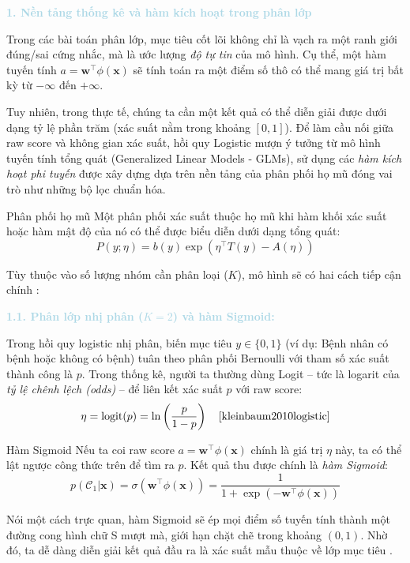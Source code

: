 \vspace{0.5em}
\noindent\textcolor{lightblue}{\textbf{1. Nền tảng thống kê và hàm kích hoạt trong phân lớp}}
\vspace{0.5em}

Trong các bài toán phân lớp, mục tiêu cốt lõi không chỉ là vạch ra một ranh giới đúng/sai cứng nhắc, mà là ước lượng \textit{độ tự tin} của mô hình. Cụ thể, một hàm tuyến tính $a = \mathbf{w}^\top \phi(\mathbf{x})$ sẽ tính toán ra một điểm số thô có thể mang giá trị bất kỳ từ $-\infty$ đến $+\infty$. 

Tuy nhiên, trong thực tế, chúng ta cần một kết quả có thể diễn giải được dưới dạng tỷ lệ phần trăm (xác suất nằm trong khoảng $[0, 1]$). Để làm cầu nối giữa raw score và không gian xác suất, hồi quy Logistic mượn ý tưởng từ mô hình tuyến tính tổng quát (Generalized Linear Models - GLMs), sử dụng các \textit{hàm kích hoạt phi tuyến} được xây dựng dựa trên nền tảng của phân phối họ mũ đóng vai trò như những bộ lọc chuẩn hóa.

\begin{infobox}{Phân phối họ mũ}
Một phân phối xác suất thuộc họ mũ khi hàm khối xác suất hoặc hàm mật độ của nó có thể được biểu diễn dưới dạng tổng quát:
\begin{equation}
    P(y;\eta) = b(y)\exp(\eta^\top T(y) - A(\eta))
\end{equation}
\end{infobox}

Tùy thuộc vào số lượng nhóm cần phân loại ($K$), mô hình sẽ có hai cách tiếp cận chính \cite{bishop2006pattern}:

\vspace{0.5em}
\noindent\textcolor{lightblue}{\textbf{1.1. Phân lớp nhị phân ($K = 2$) và hàm Sigmoid:}}

Trong hồi quy logistic nhị phân, biến mục tiêu $y \in \{0, 1\}$ (ví dụ: Bệnh nhân có bệnh hoặc không có bệnh) tuân theo phân phối Bernoulli với tham số xác suất thành công là $p$. Trong thống kê, người ta thường dùng Logit -- tức là logarit của \textit{tỷ lệ chênh lệch (odds)} -- để liên kết xác suất $p$ với raw score:
\begin{equation}
    \eta = \text{logit}(p) = \ln\left(\frac{p}{1-p}\right) \quad \text{\cite{kleinbaum2010logistic}}
\end{equation}

\begin{importantbox}{Hàm Sigmoid}
Nếu ta coi raw score $a = \mathbf{w}^\top \phi(\mathbf{x})$ chính là giá trị $\eta$ này, ta có thể lật ngược công thức trên để tìm ra $p$. Kết quả thu được chính là \textit{hàm Sigmoid}:
\begin{equation}
    p(\mathcal{C}_1 | \mathbf{x}) = \sigma(\mathbf{w}^\top \phi(\mathbf{x})) = \frac{1}{1 + \exp(-\mathbf{w}^\top \phi(\mathbf{x}))}
\end{equation}

Nói một cách trực quan, hàm Sigmoid sẽ ép mọi điểm số tuyến tính thành một đường cong hình chữ S mượt mà, giới hạn chặt chẽ trong khoảng $(0, 1)$. Nhờ đó, ta dễ dàng diễn giải kết quả đầu ra là xác suất mẫu thuộc về lớp mục tiêu \cite{kleinbaum2010logistic}.
\end{importantbox}


